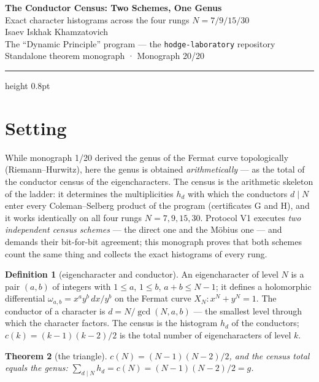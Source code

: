 \documentclass[11pt,a4paper]{article}
\theoremstyle{plain}
\newtheorem{theorem}{Theorem}
\theoremstyle{definition}
\newtheorem{definition}[theorem]{Definition}
\theoremstyle{remark}
\begin{document}
\begin{center}
{\LARGE\bfseries The Conductor Census: Two Schemes, One Genus}\\[0.4em]
{\large Exact character histograms across the four rungs $N=7/9/15/30$}\\[0.6em]
{\normalsize Isaev Iskhak Khamzatovich}\\[0.2em]
{\small The ``Dynamic Principle'' program --- the \texttt{hodge-laboratory} repository}\\[0.15em]
{\small Standalone theorem monograph · Monograph 20/20}
\end{center}
\vspace{0.4em}
{\color{linkblue}\hrule height 0.8pt}
\vspace{0.8em}

\section{Setting}

While monograph 1/20 derived the genus of the Fermat curve
topologically (Riemann--Hurwitz), here the genus is obtained
\emph{arithmetically} --- as the total of the conductor census of
the eigencharacters. The census is the arithmetic skeleton of the
ladder: it determines the multiplicities $h_d$ with which the
conductors $d\mid N$ enter every Coleman--Selberg product of the
program (certificates G and H), and it works identically on all
four rungs $N=7,9,15,30$. Protocol V1 executes \emph{two
independent census schemes} --- the direct one and the
M\"obius one --- and demands their bit-for-bit agreement; this
monograph proves that both schemes count the same thing and
collects the exact histograms of every rung.

\begin{definition}[eigencharacter and conductor]\label{th:def}
An eigencharacter of level $N$ is a pair $(a,b)$ of integers with
$1\le a$, $1\le b$, $a+b\le N-1$; it defines a holomorphic
differential $\omega_{a,b}=x^ay^b\,dx/y^b$ on the Fermat curve
$X_N\colon x^N+y^N=1$. The conductor of a character is
$d=N/\gcd(N,a,b)$ --- the smallest level through which the
character factors. The census is the histogram $h_d$ of the
conductors; $c(k)=(k-1)(k-2)/2$ is the total number of
eigencharacters of level $k$.
\end{definition}

\begin{theorem}[the triangle]\label{th:tri}
$c(N)=(N-1)(N-2)/2$, and the census total equals the genus:
$\sum_{d\mid N}h_d=c(N)=(N-1)(N-2)/2=g$.
\end{theorem}
\end{document}
